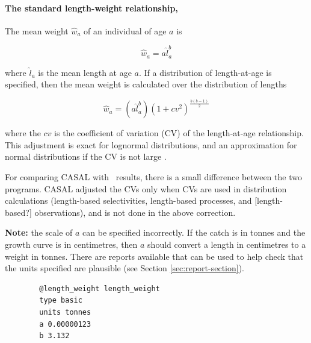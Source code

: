 \paragraph[Basic]{The standard length-weight relationship, }\label{Length-weight relationship:Basic}

The mean weight $\hat{w}_a$ of an individual of age $a$ is

\begin{equation}
  \hat{w}_a=a \hat{l}_a^b
\end{equation}

where $\hat{l}_a$ is the mean length at age $a$. If a distribution of length-at-age is specified, then the mean weight is calculated over the distribution of lengths

\begin{equation}
  \hat{w}_a=(a\hat{l}_a^b)(1+cv^2)^{\frac{b(b-1)}{2}}
\end{equation}

where the $cv$ is the coefficient of variation (CV) of the length-at-age relationship. This adjustment is exact for lognormal distributions, and an approximation for normal distributions if the CV is not large \citep{1388}.

For comparing CASAL with \CNAME~results, there is a small difference between the two programs. CASAL adjusted the CVs  only when CVs are used in distribution calculations (length-based selectivities, length-based processes, and [length-based?] observations), and is not done in the above correction.

\textbf{Note:}  the scale of $a$ can be specified incorrectly. If the catch is in tonnes and the growth curve is in centimetres, then $a$ should convert a length in centimetres to a weight in tonnes. There are reports available that can be used to help check that the units specified are plausible (see Section \ref{sec:report-section}).

{\small{\begin{verbatim}
		@length_weight length_weight
		type basic
		units tonnes
		a 0.00000123
		b 3.132
\end{verbatim}}}

\subsection{\label{sec:weight-at-age}}

